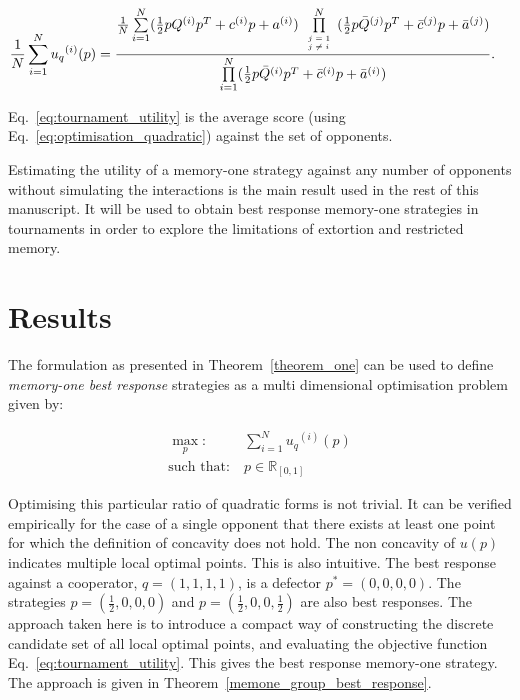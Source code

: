 \documentclass[10pt]{article}
\newcommand{\R}{\mathbb{R}}
\begin{document}
\begin{align}\label{eq:tournament_utility}
       & \frac{1}{N} \sum\limits_{i=1} ^ {N} {u_q}^{(i)} (p) =
       \frac{\frac{1}{N} \sum\limits_{i=1} ^ {N} (\frac{1}{2} pQ^{(i)} p^T + c^{(i)} p + a^ {(i)})
       \prod\limits_{\tiny\begin{array}{l} j=1 \\ j \neq i \end{array}} ^
       N (\frac{1}{2} p\bar{Q}^{(j)} p^T + \bar{c}^{(j)} p + \bar{a}^ {(j)})}
       {\prod\limits_{i=1} ^ N (\frac{1}{2} p\bar{Q}^{(i)} p^T + \bar{c}^{(i)} p + \bar{a}^ {(i)})}.
\end{align}

Eq.~\ref{eq:tournament_utility} is the average score (using Eq.~\ref{eq:optimisation_quadratic}) against the set of opponents.

Estimating the utility of a memory-one strategy against any number of opponents
without simulating the interactions is the main result used in the rest of this manuscript.
It will be used to obtain best response memory-one strategies in tournaments
in order to explore the limitations of extortion
and restricted memory.

\section{Results}\label{section:results}

The formulation as presented in Theorem~\ref{theorem_one} can be used to
define \textit{memory-one best response} strategies as a multi dimensional
optimisation problem given by:

\begin{equation}\label{eq:mo_tournament_optimisation}
    \begin{aligned}
    \max_p: & \ \sum_{i=1} ^ {N} {u_q}^{(i)} (p)
    \\
    \text{such that}: & \ p \in \R_{[0, 1]}
    \end{aligned}
\end{equation}

Optimising this particular ratio of quadratic forms is not trivial. It can be
verified empirically for the case of a single opponent that there exists at
least one point for which the definition of concavity does not hold.
The non concavity of \(u(p)\) indicates multiple local
optimal points. This is also intuitive. The best response against a cooperator,
\(q=(1, 1, 1, 1)\), is a defector \(p^*=(0, 0, 0, 0)\). The strategies
\(p=(\frac{1}{2}, 0, 0, 0)\) and \(p=(\frac{1}{2}, 0, 0, \frac{1}{2})\) are also
best responses. The approach taken here is to introduce a compact way of
constructing the discrete candidate set of all local optimal points, and evaluating
the objective function Eq.~\ref{eq:tournament_utility}. This gives the best
response memory-one strategy. The approach is given in
Theorem~\ref{memone_group_best_response}.
\end{document}
